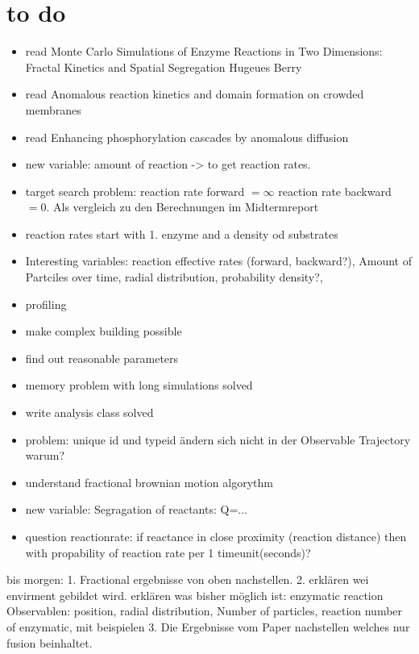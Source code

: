 \documentclass[
  a4paper,BCOR10mm,oneside,
  bibtotoc,idxtotoc,
  headsepline,footsepline,%
  fleqn,openbib
]{scrbook}
\begin{document}
\section{to do}
\begin{itemize}
 \item read Monte Carlo Simulations of Enzyme Reactions in Two Dimensions:
Fractal Kinetics and Spatial Segregation Hugeues Berry
 \item read Anomalous reaction kinetics and domain formation on crowded membranes
 \item read Enhancing phosphorylation cascades by anomalous diffusion
 \item new variable: amount of reaction -> to get reaction rates.
 \item target search problem: reaction rate forward $= \infty$ reaction rate backward $=0$. Als vergleich zu den Berechnungen im Midtermreport
 \item reaction rates start with 1. enzyme and a density od substrates
 \item Interesting variables: reaction effective rates (forward, backward?), Amount of Partciles over time, radial distribution, probability density?,
 \item profiling
 \item make complex building possible
 \item find out reasonable parameters
 \item memory problem with long simulations solved
 \item write analysis class solved 
 \item problem: unique id und typeid ändern sich nicht in der Observable Trajectory warum?
 \item understand fractional brownian motion algorythm
 \item new variable: Segragation of reactants: Q=... \cite{Hellmann2011}
 \item question reactionrate: if reactance in close proximity (reaction distance) then with propability of reaction rate per 1 timeunit(seconds)?
\end{itemize}

bis morgen:
1. Fractional ergebnisse von oben nachstellen.
2. erklären wei envirment gebildet wird.
erklären was bisher möglich ist:
enzymatic reaction
Observablen:
position,
radial distribution,
Number of particles,
reaction number of enzymatic,
mit beispielen
3. Die Ergebnisse vom Paper nachstellen welches nur  fusion beinhaltet.
\end{document}
